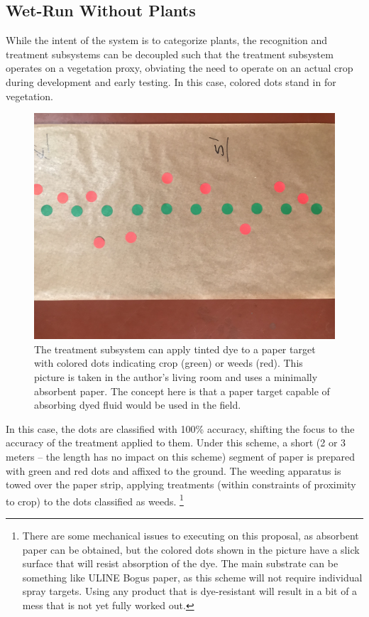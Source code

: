 \documentclass[12pt]{article}
\begin{document}
\subsection{Wet-Run Without Plants}
\label{section:wet-run-without-plants}
While the intent of the system is to categorize plants, the recognition and treatment subsystems can be decoupled such that the treatment subsystem operates on a vegetation proxy, obviating the need to operate on an actual crop during development and early testing. In this case, colored dots stand in for vegetation.

\begin{figure}[H]
	\centering
	\includegraphics[width=0.45\linewidth]{./figures/green-red-dots.jpg}
	\caption[Red and green dots applied to paper for assessing spray accuracy]{The treatment subsystem can apply tinted dye to a paper target with colored dots indicating crop (green) or weeds (red). This picture is taken in the author's living room and uses a minimally absorbent paper. The concept here is that a paper target capable of absorbing dyed fluid would be used in the field.}
	\label{fig:green-red-dots}
\end{figure}
 In this case, the dots are classified with 100\% accuracy, shifting the focus to the accuracy of the treatment applied to them. Under this scheme, a short (2 or 3 meters -- the length has no impact on this scheme) segment of paper is prepared with green and red dots and affixed to the ground. The weeding apparatus is towed over the paper strip, applying treatments (within constraints of proximity to crop) to the dots classified as weeds. \footnote{There are some mechanical issues to executing on this proposal, as absorbent paper can be obtained, but the colored dots shown in the picture have a slick surface that will resist absorption of the dye. The main substrate can be something like ULINE Bogus paper, as this scheme will not require individual spray targets. Using any product that is dye-resistant will result in a bit of a mess that is not yet fully worked out.}
\end{document}
